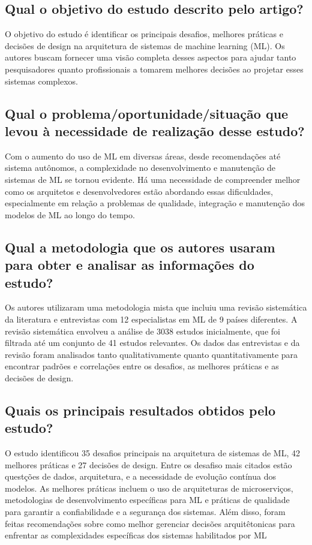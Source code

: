 \subsection*{\textbf{Qual o objetivo do estudo descrito pelo artigo?}}
O objetivo do estudo é identificar os
principais desafios, melhores práticas e
decisões de design na arquitetura de sistemas
de machine learning (ML). Os autores
buscam fornecer uma visão completa desses
aspectos para ajudar tanto pesquisadores
quanto profissionais a tomarem melhores
decisões ao projetar esses sistemas
complexos.

\subsection*{\textbf{Qual o problema/oportunidade/situação que levou à necessidade de realização desse estudo?}}
Com o aumento do uso de ML em diversas
áreas, desde recomendações até sistema
autônomos, a complexidade no
desenvolvimento e manutenção de sistemas
de ML se tornou evidente. Há uma
necessidade de compreender melhor como os
arquitetos e desenvolvedores estão
abordando essas dificuldades, especialmente
em relação a problemas de qualidade,
integração e manutenção dos modelos de ML
ao longo do tempo.

\subsection*{\textbf{Qual a metodologia que os autores usaram para obter e analisar as informações do estudo?}}
Os autores utilizaram uma metodologia
mista que incluiu uma revisão sistemática da
literatura e entrevistas com 12 especialistas
em ML de 9 países diferentes. A revisão
sistemática envolveu a análise de 3038
estudos inicialmente, que foi filtrada até um
conjunto de 41 estudos relevantes. Os dados
das entrevistas e da revisão foram analisados
tanto qualitativamente quanto
quantitativamente para encontrar padrões e
correlações entre os desafios, as melhores
práticas e as decisões de design.

\subsection*{\textbf{Quais os principais resultados obtidos pelo estudo?}}
O estudo identificou 35 desafios principais
na arquitetura de sistemas de ML, 42
melhores práticas e 27 decisões de design.
Entre os desafiso mais citados estão
questções de dados, arquitetura, e a
necessidade de evolução contínua dos
modelos. As melhores práticas incluem o uso
de arquiteturas de microserviços,
metodologias de desenvolvimento
específicas para ML e práticas de qualidade
para garantir a confiabilidade e a segurança
dos sistemas. Além disso, foram feitas
recomendações sobre como melhor gerenciar
decisões arquitêtonicas para enfrentar as
complexidades específicas dos sistemas
habilitados por ML